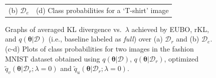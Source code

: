 \documentclass{article}
\theoremstyle{definition}
\newcommand{\mcl}[1]{\mathcal{#1}}
\newcommand{\da}{\mcl{D}}
\newcommand{\dc}{\mcl{D}_r}
\newcommand{\dr}{\mcl{D}_e}
\newcommand{\eubo}{\tilde{q}_u}
\newcommand{\elbo}{\tilde{q}_v}
\begin{document}
\begin{figure}
\begin{tabular}{@{}c|c@{}c@{}}
\\
(b) $\dr$ & \multicolumn{2}{c}{(d) Class probabilities for a `T-shirt' image}
\end{tabular}%
\caption{Graphs of averaged KL divergence vs.~$\lambda$ achieved by EUBO, rKL, and $q(\bm{\theta}|\da)$ (i.e., baseline labeled as \emph{full}) over (a) $\dc$ and (b) $\dr$. (c-d) Plots of class probabilities for two images in the fashion MNIST dataset obtained using $q(\bm{\theta}|\da)$, $q(\bm{\theta}|\dc)$, optimized $\elbo(\bm{\theta}|\dc; \lambda = 0)$ and $\eubo(\bm{\theta}|\dc; \lambda = 0)$.}
\label{fig:mnistresult}%
\end{figure}
%
%
%
\end{document}
